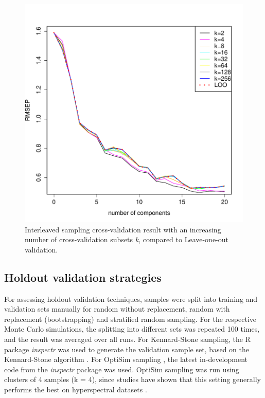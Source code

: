 \documentclass{isprs}
\begin{document}
\begin{figure}[ht!]
\includegraphics[width=1.0\columnwidth]{../script/output/interleaved-group-sizes.pdf}
\begin{center}
    \caption{Interleaved sampling cross-validation result with an increasing number of cross-validation subsets \textit{k}, compared to Leave-one-out validation.}
    \label{fig:interleaved-group-sizes}
\end{center}
\end{figure}

\subsection{Holdout validation strategies}\label{sec:Holdout validation strategies}

For assessing holdout validation techniques, samples were split into training and validation sets manually for random without replacement, random with replacement (bootstrapping) and stratified random sampling. For the respective Monte Carlo simulations, the splitting into different sets was repeated 100 times, and the result was averaged over all runs. For Kennard-Stone sampling, the R package \textit{inspectr} was used to generate the validation sample set, based on the Kennard-Stone algorithm \cite{kennard1969computer}. For OptiSim sampling \cite{clark1997optisim}, the latest in-development code from the \textit{inspectr} package was used. OptiSim sampling was run using clusters of 4 samples (k = 4), since studies have shown that this setting generally performs the best on hyperspectral datasets \cite{clark2003boosted}.
\end{document}
